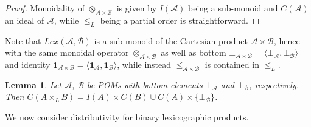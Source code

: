 \documentclass[a4paper]{elsarticle}
\newtheorem{lemma}{Lemma}
\newcommand{\monop}{\otimes}
\newcommand{\1}{\mathbf{1}}
\begin{document}
\begin{proof}
	Monoidality of $\monop_{\mathcal{A} \times \mathcal{B}}$ is given by  $I(\mathcal{A})$ being a sub-monoid
	and $C(\mathcal{A})$ an ideal of $\mathcal{A}$, while $\leq_L$ being a partial order is straightforward.
\end{proof}

Note that $Lex(\mathcal{A},\mathcal{B})$ is a sub-monoid of the Cartesian product $\mathcal{A} \times \mathcal{B}$,
hence with the same monoidal operator $\monop_{\mathcal{A} \times \mathcal{B}}$ as well as 
bottom $\bot_{\mathcal{A} \times \mathcal{B}} = \langle \bot_\mathcal{A}, \bot_\mathcal{B} \rangle$ and
identity $\1_{\mathcal{A} \times \mathcal{B}} = \langle \1_\mathcal{A}, \1_\mathcal{B} \rangle$,
while instead $\leq_{\mathcal{A} \times \mathcal{B}}$ is contained in $\leq_L$.
%

\begin{lemma}
Let $\mathcal{A}$, $\mathcal{B}$ be POMs with bottom elements $\bot_\mathcal{A}$ and $\bot_\mathcal{B}$, 
respectively.
Then $C(A \times_L B) = I(A) \times C(B) \cup C(A) \times \{\bot_\mathcal{B}\}$.
\end{lemma}

We now consider distributivity for binary lexicographic products.
\end{document}
